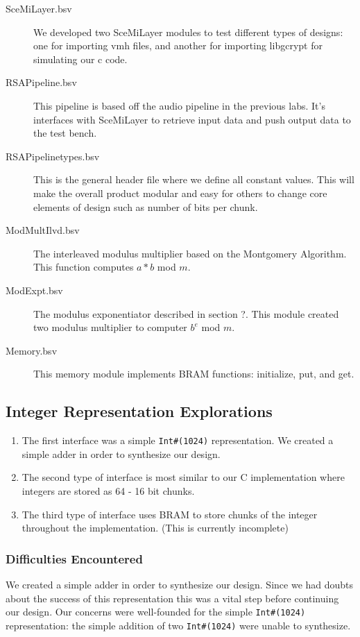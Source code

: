 \documentclass[12pt]{article}
\begin{document}
\begin{description}
  \item[SceMiLayer.bsv] We developed two SceMiLayer modules to test different types of designs: one for importing vmh files, and another for importing libgcrypt for simulating our c code.  
  \item[RSAPipeline.bsv] This pipeline is based off the audio pipeline in the previous labs.  It's interfaces with SceMiLayer to retrieve input data and push output data to the test bench.
  \item[RSAPipelinetypes.bsv] This is the general header file where we define all constant values.  This will make the overall product modular and easy for others to change core elements of design such as number of bits per chunk.
  \item[ModMultIlvd.bsv] The interleaved modulus multiplier based on the Montgomery Algorithm.  This function computes $a*b$ mod $m$.
  \item[ModExpt.bsv] The modulus exponentiator described in section ?.  This module created two modulus multiplier to computer $b^e$ mod $m$.
  \item[Memory.bsv] This memory module implements BRAM functions: initialize, put, and get.  
\end{description}

\subsection{Integer Representation Explorations}
\begin{enumerate}
\item The first interface was a simple {\tt Int\#(1024)} representation. We created a simple adder in order to synthesize our design.
\item The second type of interface is most similar to our C implementation where integers are stored as 64 - 16 bit chunks.
\item The third type of interface uses BRAM to store chunks of the integer throughout the implementation. (This is currently incomplete)
\end{enumerate}
\subsubsection{Difficulties Encountered}
We created a simple adder in order to synthesize our design.  Since we had doubts about the success of this representation this was a vital step before continuing our design. Our concerns were well-founded for the simple {\tt Int\#(1024)} representation: the simple addition of two {\tt Int\#(1024)} were unable to synthesize.
\end{document}
